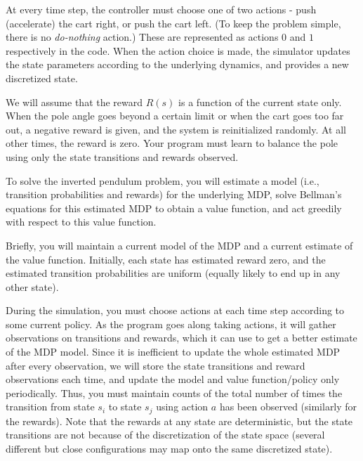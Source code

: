 At every time step, the controller must choose one of two actions -
push (accelerate) the cart right, or push the cart left.
(To keep the problem simple, there is no {\it do-nothing} action.)
These are represented as actions $0$ and $1$ respectively in the code.  
When the action choice is made, the simulator updates the state parameters 
according to the underlying dynamics, and provides a new discretized state.

We will assume that the reward $R(s)$ is a function of the current state only.
When the pole angle goes beyond a certain limit or when the cart goes
too far out, a negative reward is given, and the system is reinitialized 
randomly. At all other times, the reward is zero.  Your program must learn 
to balance the pole using only the state transitions and rewards observed.


  To solve the inverted pendulum problem, you will estimate a 
  model (i.e., transition probabilities and rewards) for the underlying 
  MDP, solve Bellman's equations for this estimated MDP to obtain
  a value function, and act greedily with respect to this value function.  

  Briefly, you will maintain a current model of the MDP and a current
  estimate of the value function. Initially, each state has estimated reward zero,
  and the estimated transition probabilities are uniform (equally likely 
  to end up in any other state).

  During the simulation, you must choose actions at each time step 
  according to some current policy.  As the program goes along taking 
  actions, it will gather observations on transitions and rewards,
  which it can use to get a better estimate of the MDP model.
  Since it is inefficient to update the whole estimated MDP after every 
  observation, we will store the state transitions and reward observations 
  each time, and update the model and value function/policy only periodically. 
  Thus, you must maintain counts of the total number of times the 
  transition from state $s_i$ to state $s_j$ using action $a$ has been 
  observed (similarly for the rewards).  Note that the rewards at 
  any state are deterministic, but the state transitions are not because 
  of the discretization of the state space (several different but close
  configurations may map onto the same discretized state).


